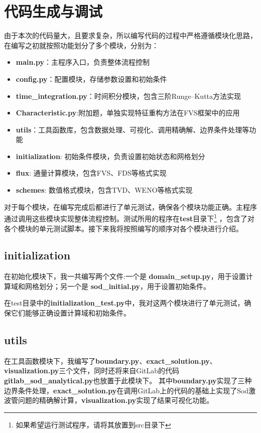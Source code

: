 \documentclass[UTF8]{ctexart}
\begin{document}
\section{代码生成与调试}
由于本次的代码量大，且要求复杂，所以编写代码的过程中严格遵循模块化思路，在编写之初就按照功能划分了多个模块，分别为：
\begin{itemize}
    \item \textbf{main.py}：主程序入口，负责整体流程控制
    \item \textbf{config.py}：配置模块，存储参数设置和初始条件
    \item \textbf{time\_integration.py}：时间积分模块，包含三阶Runge--Kutta方法实现
    \item \textbf{Characteristic.py}:附加题，单独实现特征重构方法在FVS框架中的应用
    \item \textbf{utils}：工具函数库，包含数据处理、可视化、调用精确解、边界条件处理等功能
    \item \textbf{initialization}: 初始条件模块，负责设置初始状态和网格划分
    \item \textbf{flux}: 通量计算模块，包含FVS、FDS等格式实现
    \item \textbf{schemes}: 数值格式模块，包含TVD、WENO等格式实现
\end{itemize}
对于每个模块，在编写完成后都进行了单元测试，确保各个模块功能正确。主程序通过调用这些模块实现整体流程控制。测试所用的程序在\textbf{test}目录下\footnote{如果希望运行测试程序，请将其放置到src目录下}
，包含了对各个模块的单元测试脚本。接下来我将按照编写的顺序对各个模块进行介绍。
\subsection{initialization}
在初始化模块下，我一共编写两个文件:一个是 \textbf{domain\_setup.py}，用于设置计算域和网格划分；另一个是 \textbf{sod\_initial.py}，用于设置初始条件。

在test目录中的\textbf{initialization\_test.py}中，我对这两个模块进行了单元测试，确保它们能够正确设置计算域和初始条件。
\subsection{utils}
在工具函数模块下，我编写了\textbf{boundary.py}、\textbf{exact\_solution.py}、\textbf{visualization.py}三个文件，同时还将来自GitLab\cite{sodcal2025}的代码\textbf{gitlab\_sod\_analytical.py}也放置于此模块下。
其中\textbf{boundary.py}实现了三种边界条件处理，\textbf{exact\_solution.py}在调用GitLab上的代码的基础上实现了Sod激波管问题的精确解计算，\textbf{visualization.py}实现了结果可视化功能。
\end{document}
